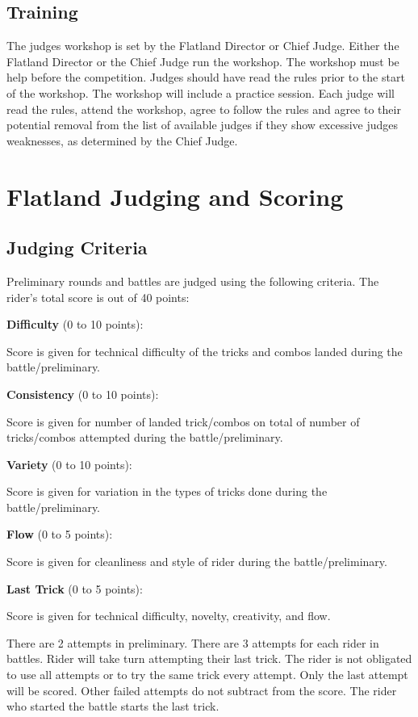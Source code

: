 \subsection{Training}
The judges workshop is set by the Flatland Director or Chief Judge.
Either the Flatland Director or the Chief Judge run the workshop.
The workshop must be help before the competition.
Judges should have read the rules prior to the start of the workshop.
The workshop will include a practice session.
Each judge will read the rules, attend the workshop,  agree to follow the rules and agree to their potential removal from the list of available judges if they show excessive judges weaknesses, as determined by the Chief Judge.

\section{Flatland Judging and Scoring \label{sec:flat\itemstreet_flatland\itemjudging\itemscoring}}

\subsection{Judging Criteria}

Preliminary rounds and battles are judged using the following criteria.
The rider's total score is out of 40 points:

\textbf{Difficulty} (0 to 10 points):

Score is given for technical difficulty of the tricks and combos landed during the battle/preliminary.

\textbf{Consistency} (0 to 10 points):

Score is given for number of landed trick/combos on total of number of tricks/combos attempted during the battle/preliminary.

\textbf{Variety} (0 to 10 points):

Score is given for variation in the types of tricks done during the battle/preliminary.

\textbf{Flow} (0 to 5 points):

Score is given for cleanliness and style of rider during the battle/preliminary.

\textbf{Last Trick} (0 to 5 points):

Score is given for technical difficulty, novelty, creativity, and flow.

There are 2 attempts in preliminary. 
There are 3 attempts for each rider in battles. Rider will take turn attempting their last trick. The rider is not obligated to use all attempts or to try the same trick every attempt.
Only the last attempt will be scored.
Other failed attempts do not subtract from the score. The rider who started the battle starts the last trick.

